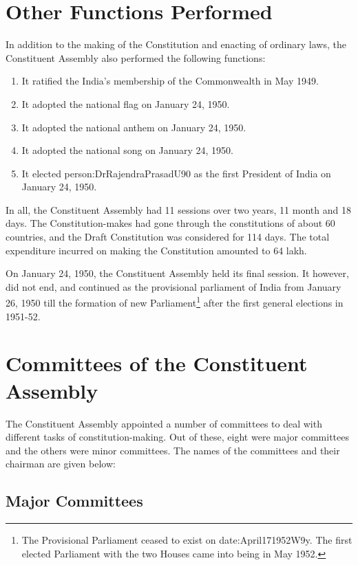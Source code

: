 \section{Other Functions Performed}

In addition to the making of the Constitution and enacting of ordinary laws, the Constituent Assembly also performed the following functions:

\begin{enumerate}
  \item It ratified the India's membership of the Commonwealth in May 1949.
  \item It adopted the national flag on January 24, 1950.
  \item It adopted the national anthem on January 24, 1950.
  \item It adopted the national song on January 24, 1950.
  \item It elected \gls{person:DrRajendraPrasadU90} as the first President of India on January 24, 1950.
\end{enumerate}

In all, the Constituent Assembly had 11 sessions over two years, 11 month and 18 days. The Constitution-makes had gone through the constitutions of about 60 countries, and the Draft Constitution was considered for 114 days. The total expenditure incurred on making the Constitution amounted to 64 lakh.

On January 24, 1950, the Constituent Assembly held its final session. It however, did not end, and continued as the provisional parliament of India from January 26, 1950 till the formation of new Parliament\footnote{The Provisional Parliament ceased to exist on \gls{date:April171952W9y}. The first elected Parliament with the two Houses came into being in May 1952.} after the first general elections in 1951-52.

\section{Committees of the Constituent Assembly}

The Constituent Assembly appointed a number of committees to deal with different tasks of constitution-making. Out of these, eight were major committees and the others were minor committees. The names of the committees and their chairman are given below:

\subsection{Major Committees}

